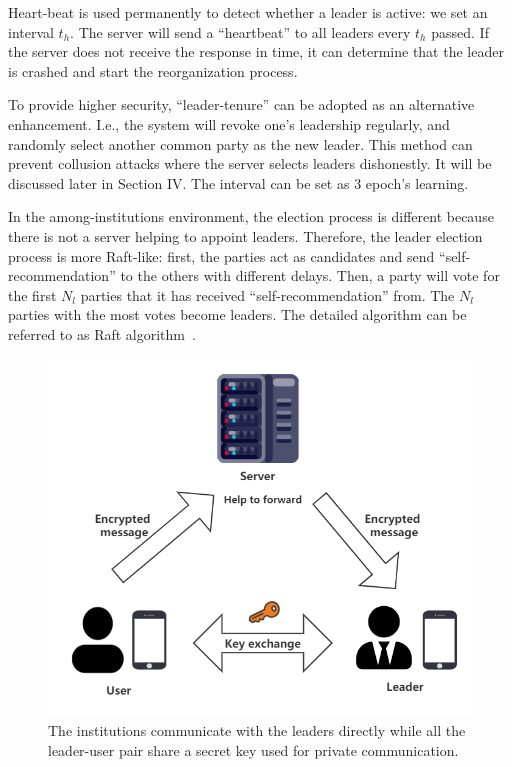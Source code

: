 Heart-beat is used permanently to detect whether a leader is active: we set an interval $t_h$. The server will send a ``heartbeat'' to all leaders every $t_h$ passed. If the server does not receive the response in time, it can determine that the leader is crashed and start the reorganization process.

To provide higher security, ``leader-tenure'' can be adopted as an alternative enhancement. I.e., the system will revoke one's leadership regularly, and randomly select another common party as the new leader. This method can prevent collusion attacks where the server selects leaders dishonestly. It will be discussed later in Section IV. The interval can be set as 3 epoch's learning.

In the among-institutions environment, the election process is different because there is not a server helping to appoint leaders. Therefore, the leader election process is more Raft-like: first, the parties act as candidates and send ``self-recommendation'' to the others with different delays. Then, a party will vote for the first $N_l$ parties that it has received ``self-recommendation'' from. The $N_l$ parties with the most votes become leaders. The detailed algorithm can be referred to as Raft algorithm~\cite{Raft}.

\begin{figure}[!ht]
    \centering
    \includegraphics[width=\columnwidth]{img/leader-user.png}
    \caption{The institutions communicate with the leaders directly while all the leader-user pair share a secret key used for private communication.}
    \label{leader-user}
\end{figure}

